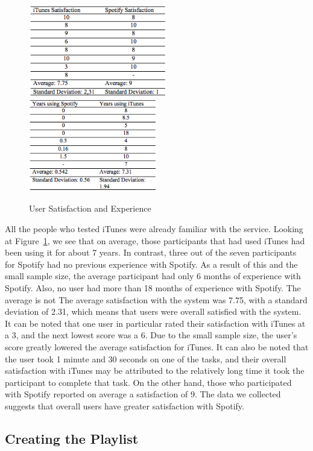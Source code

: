 \documentclass[11pt]{article}
\begin{document}
\begin{figure}[H] %
   \centering
   \includegraphics[width=2.4in]{satisfaction_.png}       
   \includegraphics[width=2.22in]{times_used.png} 
   \caption{User Satisfaction and Experience}
   \label{fig:satisfaction}
\end{figure}

All the people who tested iTunes were already familiar with the service. Looking at Figure~\ref{fig:satisfaction}, we see that on average, those participants that had used iTunes had been using it for about 7 years. In contrast, three out of the seven participants for Spotify had no previous experience with Spotify. As a result of this and the small sample size, the average participant had only 6 months of experience with Spotify. Also, no user had more than 18 months of experience with Spotify. The average is not  The average satisfaction with the system was 7.75, with a standard deviation of 2.31, which means that users were overall satisfied with the system. It can be noted that one user in particular rated their satisfaction with iTunes at a 3, and the next lowest score was a 6. Due to the small sample size, the user's score greatly lowered the average satisfaction for iTunes. It can also be noted that the user took 1 minute and 30 seconds on one of the tasks, and their overall satisfaction with iTunes may be attributed to the relatively long time it took the participant to complete that task. On the other hand, those who participated with Spotify reported on average a satisfaction of 9. The data we collected suggests that overall users have greater satisfaction with Spotify.

\subsection{Creating the Playlist}
\end{document}
